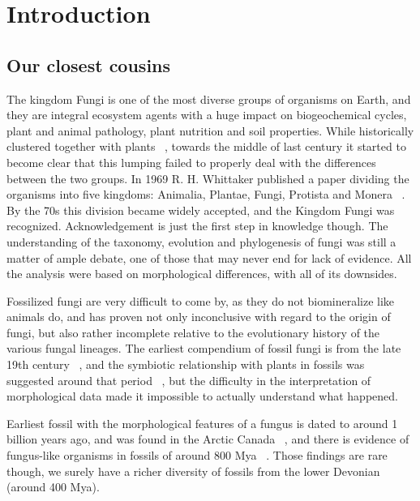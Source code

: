 \def\bibliocommand{}


\part{Introduction}
\label{introduction}

\chapter{Our closest cousins}
\label{ourclosestcousins}

The kingdom Fungi is one of the most diverse groups of organisms on Earth, and they are integral ecosystem agents with a huge impact on biogeochemical cycles, plant and animal pathology, plant nutrition and soil properties.
While historically clustered together with plants ~\citep{copeland1938, copeland1956}, towards the middle of last century it started to become clear that this lumping failed to properly deal with the differences between the two groups. In 1969 R. H. Whittaker published a paper dividing the organisms into five kingdoms: Animalia, Plantae, Fungi, Protista and Monera ~\citep{whittaker1969}. By the 70s this division became widely accepted, and the Kingdom Fungi was recognized.
Acknowledgement is just the first step in knowledge though. The understanding of the taxonomy, evolution and phylogenesis of fungi was still a matter of ample debate, one of those that may never end for lack of evidence. All the analysis were based on morphological differences, with all of its downsides.

Fossilized fungi are very difficult to come by, as they do not biomineralize like animals do, and has proven not only inconclusive with regard to the origin of fungi, but also rather incomplete relative to the evolutionary history of the various fungal lineages. The earliest compendium of fossil fungi is from the late 19th century ~\citep{meschinelli1898}, and the symbiotic relationship with plants in fossils was suggested around that period ~\citep{renault1896}, but the difficulty in the interpretation of morphological data made it impossible to actually understand what happened.

Earliest fossil with the morphological features of a fungus is dated to around 1 billion years ago, and was found in the Arctic Canada ~\citep{loron2019}, and there is evidence of fungus-like organisms in fossils of around 800 Mya ~\citep{bonneville2020}. Those findings are rare though, we surely have a richer diversity of fossils from the lower Devonian (around 400 Mya).

